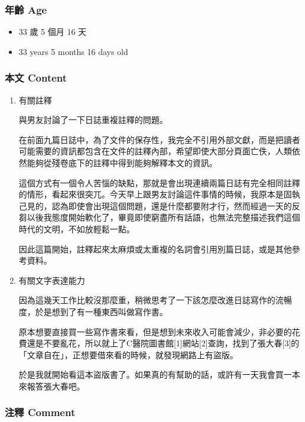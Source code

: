\documentclass[a5paper, 12pt
]{book}
\providecommand{\tightlist}{%
  \setlength{\itemsep}{0pt}\setlength{\parskip}{0pt}}
\begin{document}
\hypertarget{ux5e74ux9f61-age-9}{%
\subsubsection{年齡 Age}\label{ux5e74ux9f61-age-9}}

\begin{itemize}
\tightlist
\item
  33 歲 5 個月 16 天
\item
  33 years 5 months 16 days old
\end{itemize}

\hypertarget{ux672cux6587-content-9}{%
\subsubsection{本文 Content}\label{ux672cux6587-content-9}}

\begin{enumerate}
\def\labelenumi{\arabic{enumi}.}
\item
  有關註釋

  與男友討論了一下日誌重複註釋的問題。

  在前面九篇日誌中，為了文件的保存性，我完全不引用外部文獻，而是把讀者可能需要的資訊都包含在文件的註釋內部，希望即使大部分頁面亡佚，人類依然能夠從殘卷底下的註釋中得到能夠解釋本文的資訊。

  這個方式有一個令人苦惱的缺點，那就是會出現連續兩篇日誌有完全相同註釋的情形，看起來很突兀。今天早上跟男友討論這件事情的時候，我原本是固執己見的，認為即使會出現這個問題，還是什麼都要附才行，然而經過一天的反芻以後我態度開始軟化了，畢竟即使窮盡所有話語，也無法完整描述我們這個時代的文明，不如放輕鬆一點。

  因此這篇開始，註釋起來太麻煩或太重複的名詞會引用別篇日誌，或是其他參考資料。
\item
  有關文字表達能力

  因為這幾天工作比較沒那麼重，稍微思考了一下該怎麼改進日誌寫作的流暢度，於是想到了有一種東西叫做寫作書。

  原本想要直接買一些寫作書來看，但是想到未來收入可能會減少，非必要的花費還是不要亂花，所以就上了C醫院圖書館{[}1{]}網站{[}2{]}查詢，找到了張大春{[}3{]}的「文章自在」，正想要借來看的時候，就發現網路上有盜版。

  於是我就開始看這本盜版書了。如果真的有幫助的話，或許有一天我會買一本來報答張大春吧。
\end{enumerate}

\hypertarget{ux6ce8ux91cb-comment-3}{%
\subsubsection{注釋 Comment}\label{ux6ce8ux91cb-comment-3}}
\end{document}
